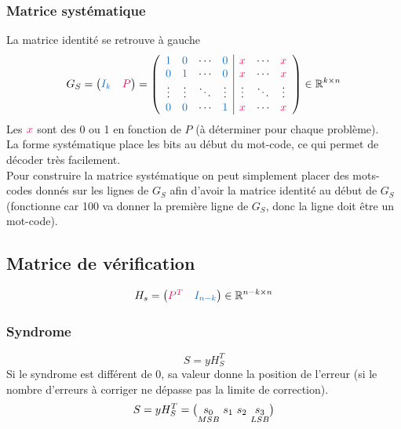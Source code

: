 \documentclass[resume.tex]{subfiles}
\begin{document}
\subsubsection{Matrice systématique}
La matrice identité se retrouve à gauche
$$G_S=\begin{pmatrix}
\textcolor{RoyalBlue}{I_k} & \textcolor{OrangeRed}{P}
\end{pmatrix}=
\left(\begin{array}{cccc|cccc}
\textcolor{RoyalBlue}{1} & \textcolor{RoyalBlue}{0} & \cdots & \textcolor{RoyalBlue}{0} & \textcolor{OrangeRed}{x} & \cdots & \textcolor{OrangeRed}{x}\\
\textcolor{RoyalBlue}{0} & \textcolor{RoyalBlue}{1} & \cdots & \textcolor{RoyalBlue}{0} & \textcolor{OrangeRed}{x} & \cdots & \textcolor{OrangeRed}{x}\\
\vdots & \vdots & \ddots & \vdots & \vdots & \ddots & \vdots\\
\textcolor{RoyalBlue}{0} & \textcolor{RoyalBlue}{0} & \cdots & \textcolor{RoyalBlue}{1} & \textcolor{OrangeRed}{x} & \cdots & \textcolor{OrangeRed}{x}
\end{array}\right)\in\mathbb{R}^{k\times n}$$
Les $\textcolor{OrangeRed}{x}$ sont des 0 ou 1 en fonction de $P$ (à déterminer pour chaque problème).\\
La forme systématique place les bits au début du mot-code, ce qui permet de décoder très facilement.\\
Pour construire la matrice systématique on peut simplement placer des mots-codes donnés sur les lignes de $G_S$ afin d'avoir la matrice identité au début de $G_S$ (fonctionne car 100 va donner la première ligne de $G_S$, donc la ligne doit être un mot-code).
\subsection{Matrice de vérification}
$$H_s=\begin{pmatrix}
\textcolor{OrangeRed}{P^{T}} & \textcolor{RoyalBlue}{I_{n-k}}
\end{pmatrix}\in\mathbb{R}^{n-k\times n}$$
\subsubsection{Syndrome}
$$S=yH_S^T$$
Si le syndrome est différent de 0, sa valeur donne la position de l'erreur (si le nombre d'erreurs à corriger ne dépasse pas la limite de correction).
$$S=yH_S^T=\big(\underset{\tiny MSB}{s_0}\ s_1\ s_2\ \underset{LSB}{s_3}\big)$$
\end{document}
